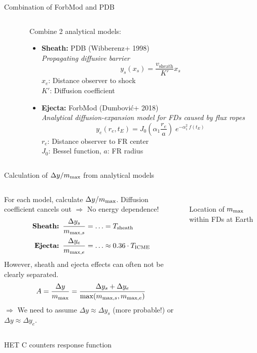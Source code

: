 \documentclass[10pt,aspectratio=169,usenames,dvipsnames]{beamer}
\newcommand{\maxt}{\ensuremath\text{max}}
\begin{document}
\begin{frame}{Combination of ForbMod and PDB}
\begin{columns}
	\begin{column}{0.48\textwidth}
		\centering
		\scalebox{0.8}{}
	\end{column}
	\begin{column}{0.5\textwidth}
		\small
		Combine 2 analytical models:
		\begin{itemize}
			\item \textbf{Sheath:} PDB (Wibberenz+ 1998)\\
			\textit{Propagating diffusive barrier}
			\[y_s(x_s) = \frac{v_\text{sheath}}{K'} x_s\]
			{\footnotesize $x_e$: Distance observer to shock\\ 
				$K'$: Diffusion coefficient}
			\item \textbf{Ejecta:} ForbMod (Dumbović+ 2018)\\
			\textit{Analytical diffusion-expansion model for FDs caused by flux ropes}
			\[y_e(r_e, t_E) = J_0\mathopen{}\left(\alpha_1 \frac{r_e}{a}\right)\mathclose{} \; e^{-\alpha_1^2\ f(t_E)}\]
			{\footnotesize $r_e$: Distance observer to FR center\\
				$J_0$: Bessel function,
				$a$: FR radius}
		\end{itemize}
	\end{column}
\end{columns}

\end{frame}

\begin{frame}{Calculation of $\Delta y/m_\maxt$ from analytical models}
\vskip0.4cm
\begin{columns}
\begin{column}{0.5\textwidth}
	For each model, calculate $\Delta y/m_\maxt$. Diffusion coefficient cancels out $\Rightarrow$ No energy dependence!
	\begin{align*}
	\textbf{Sheath: }\frac{\Delta y_s}{m_{\text{max},s}} &= \ldots = T_\text{sheath}\\
	\textbf{Ejecta: }\frac{\Delta y_e}{m_{\maxt,e}} &= \ldots \approx 0.36 \cdot T_\text{ICME}
	\end{align*}
	However, sheath and ejecta effects can often not be clearly separated.
	\[A = \frac{\Delta y}{m_\maxt} = \frac{\Delta y_s + \Delta y_e}{\max(m_{\maxt,s}, m_{\maxt,e})}\]
	$\Rightarrow$ We need to assume $\Delta y \approx \Delta y_s$ (more probable!) or $\Delta y \approx \Delta y_e$.
\end{column}
\begin{column}{0.48\textwidth}
	\centering
	\scalebox{0.8}{}\\
	Location of $m_\maxt$ within FDs at Earth
\end{column}
\end{columns}
\end{frame}

\begin{frame}{HET C counters response function}
\centering
\scalebox{0.8}{}
\end{frame}
\end{document}
